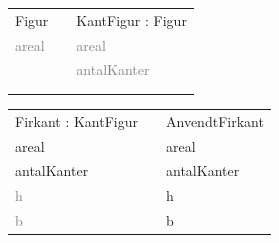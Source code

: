 \begin{frame}[fragile] 
\begin{table}[h]
\begin{tabular}{|l|l|l|}
 \cline{1-1} \cline{3-3} 
Figur          &  & KantFigur : Figur    \\ \cline{1-1} \cline{3-3} 
\textcolor{gray}{areal} &  & \textcolor{gray}{areal}       \\
               &  & \textcolor{gray}{antalKanter} \\
               &  &                      \\
               &  &                      \\ \cline{1-1} \cline{3-3} 
\end{tabular}
\end{table}
\begin{table}[h]
\begin{tabular}{|l|l|l|}
 \cline{1-1} \cline{3-3} 
Firkant : KantFigur &  & AnvendtFirkant       \\ \cline{1-1} \cline{3-3} 
areal               &  & areal                \\
antalKanter         &  & antalKanter          \\
\textcolor{gray}{h}          &  & h                    \\
\textcolor{gray}{b}          &  & b                    \\ \cline{1-1} \cline{3-3} 
\end{tabular}
\end{table}
\end{frame}

